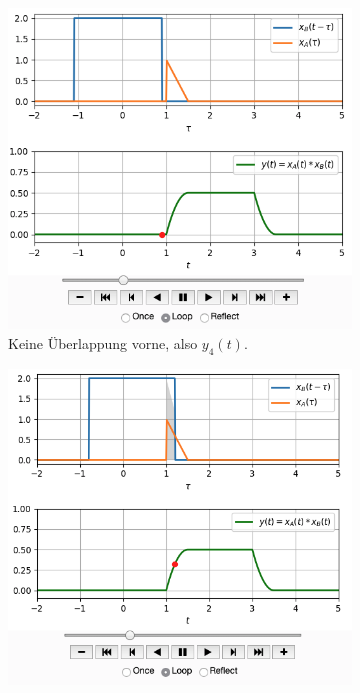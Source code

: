 \documentclass[11pt,a4paper,DIV=12]{scrartcl}
\numberwithin{equation}{section}
\numberwithin{figure}{section}
\begin{document}
\begin{figure}[h!]
\centering
\begin{subfigure}{0.45\textwidth}
\centering
\includegraphics[width=\textwidth]{../convolution_ct/conv_var2_4_1D3D68B312.png}
\caption{Keine Überlappung vorne, also $y_4(t)$.}
\label{fig:1D3D68B312_v2_4}
\end{subfigure}
\begin{subfigure}{0.45\textwidth}
\centering
\includegraphics[width=\textwidth]{../convolution_ct/conv_var2_1_1D3D68B312.png}

\end{subfigure}
\end{figure}
\end{document}
